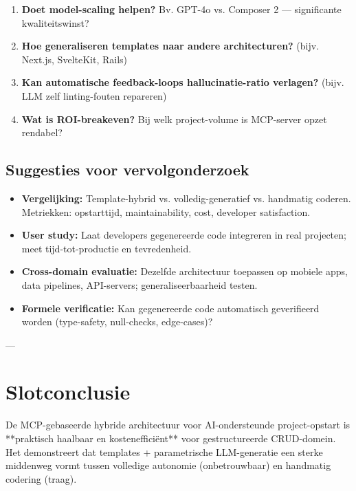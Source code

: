 \begin{enumerate}
  \item \textbf{Doet model-scaling helpen?} Bv. GPT-4o vs. Composer 2 — significante kwaliteitswinst?
  
  \item \textbf{Hoe generaliseren templates naar andere architecturen?} (bijv. Next.js, SvelteKit, Rails)
  
  \item \textbf{Kan automatische feedback-loops hallucinatie-ratio verlagen?} (bijv. LLM zelf linting-fouten repareren)
  
  \item \textbf{Wat is ROI-breakeven?} Bij welk project-volume is MCP-server opzet rendabel?
\end{enumerate}

\subsection{Suggesties voor vervolgonderzoek}

\begin{itemize}
  \item \textbf{Vergelijking:} Template-hybrid vs. volledig-generatief vs. handmatig coderen. Metriekken: opstarttijd, maintainability, cost, developer satisfaction.
  
  \item \textbf{User study:} Laat developers gegenereerde code integreren in real projecten; meet tijd-tot-productie en tevredenheid.
  
  \item \textbf{Cross-domain evaluatie:} Dezelfde architectuur toepassen op mobiele apps, data pipelines, API-servers; generaliseerbaarheid testen.
  
  \item \textbf{Formele verificatie:} Kan gegenereerde code automatisch geverifieerd worden (type-safety, null-checks, edge-cases)?
\end{itemize}

---

\section{Slotconclusie}

De MCP-gebaseerde hybride architectuur voor AI-ondersteunde project-opstart is **praktisch haalbaar en kostenefficiënt** voor gestructureerde CRUD-domein. Het demonstreert dat templates + parametrische LLM-generatie een sterke middenweg vormt tussen volledige autonomie (onbetrouwbaar) en handmatig codering (traag).

